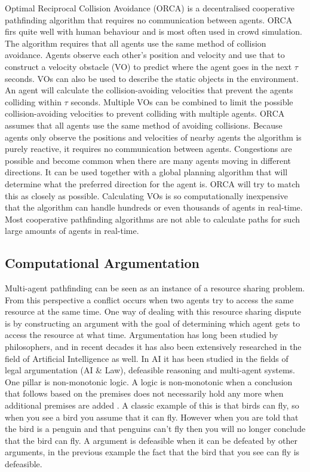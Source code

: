 Optimal Reciprocal Collision Avoidance (ORCA) \cite{vandenberg2011} is a
decentralised cooperative pathfinding algorithm that requires no communication
between agents. ORCA firs quite well with human behaviour and is most often 
used in crowd simulation. The algorithm requires that all agents use the same 
method of
collision avoidance. Agents observe each other's position and velocity and use
that to construct a velocity obstacle (VO) to predict where the agent goes in
the next $\tau$ seconds. VOs can also be used to describe the static objects in
the environment. An agent will calculate the collision-avoiding velocities that
prevent the agents colliding within $\tau$ seconds. Multiple VOs can be
combined to limit the possible collision-avoiding velocities to prevent
colliding with multiple agents. ORCA assumes that all agents use the same
method of avoiding collisions. Because agents only observe the positions and
velocities of nearby agents the algorithm is purely reactive, it requires no 
communication between agents. Congestions are
possible and become common when there are many agents moving in different
directions. It can be used together with a global planning algorithm that will
determine what the preferred direction for the agent is. ORCA will try to
match this as closely as possible. Calculating VOs is so computationally
inexpensive that the algorithm can handle hundreds or even thousands of agents
in real-time. Most cooperative pathfinding algorithms are not able to calculate
paths for such large amounts of agents in real-time.

\subsection{Computational Argumentation}
Multi-agent pathfinding can be seen as an instance of a resource sharing
problem. From this perspective a conflict occurs when two agents try to access
the same resource at the same time. One way of dealing with this resource
sharing dispute is by constructing an argument with the goal of determining
which agent gets to access the resource at what time. Argumentation has long
been studied by philosophers, and in recent decades it has also been
extensively researched in
the field of Artificial Intelligence as well. In AI it has been studied
in the fields of legal argumentation (AI \& Law), defeasible reasoning and
multi-agent systems. One pillar is non-monotonic logic. A logic is
non-monotonic when a conclusion that follows based on the premises does not
necessarily hold any more when additional premises are added
\cite{vaneemeren2014,modgil2013,rahwan2009}. A classic example of this is that 
birds can
fly, so when
you see a bird you assume that it can fly. However when you are told that the
bird is a penguin and that penguins can't fly then you will no longer conclude
that the bird can fly. A argument is defeasible when it can be defeated by
other arguments, in the previous example the fact that the bird that you see
can fly is defeasible.


